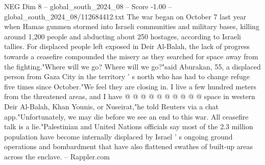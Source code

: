 \begin{textsample}{NEG Dim 8 – global\_south\_2024\_08 – Score -1.00 – global\_south\_2024\_08/112684412.txt}
The war began on October 7 last year when Hamas gunmen stormed into Israeli communities and military bases, killing around 1,200 people and abducting about 250 hostages, according to Israeli tallies.
For displaced people left exposed in Deir Al-Balah, the lack of progress towards a ceasefire compounded the misery as they searched for space away from the fighting."Where will we go?
Where will we go?"said Aburakan, 55, a displaced person from Gaza City in the territory ' s north who has had to change refuge five times since October."We feel they are closing in.
I live a few hundred meters from the threatened areas, and I have @ @ @ @ @ @ @ @ @ @ space in western Deir Al-Balah, Khan Younis, or Nuseirat,"he told Reuters via a chat app."Unfortunately, we may die before we see an end to this war.
All ceasefire talk is a lie."Palestinian and United Nations officials say most of the 2.3 million population have become internally displaced by Israel ' s ongoing ground operations and bombardment that have also flattened swathes of built-up areas across the enclave. -- Rappler.com

\end{textsample}
